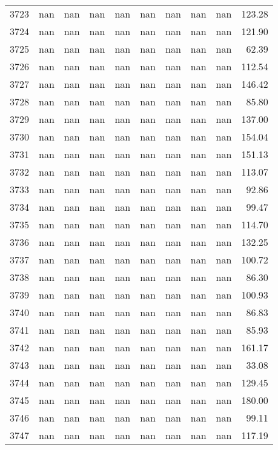 \begin{tabular}{lrrrrrrrrr}
3723 & nan & nan & nan & nan & nan & nan & nan & nan & 123.28 \\
3724 & nan & nan & nan & nan & nan & nan & nan & nan & 121.90 \\
3725 & nan & nan & nan & nan & nan & nan & nan & nan & 62.39 \\
3726 & nan & nan & nan & nan & nan & nan & nan & nan & 112.54 \\
3727 & nan & nan & nan & nan & nan & nan & nan & nan & 146.42 \\
3728 & nan & nan & nan & nan & nan & nan & nan & nan & 85.80 \\
3729 & nan & nan & nan & nan & nan & nan & nan & nan & 137.00 \\
3730 & nan & nan & nan & nan & nan & nan & nan & nan & 154.04 \\
3731 & nan & nan & nan & nan & nan & nan & nan & nan & 151.13 \\
3732 & nan & nan & nan & nan & nan & nan & nan & nan & 113.07 \\
3733 & nan & nan & nan & nan & nan & nan & nan & nan & 92.86 \\
3734 & nan & nan & nan & nan & nan & nan & nan & nan & 99.47 \\
3735 & nan & nan & nan & nan & nan & nan & nan & nan & 114.70 \\
3736 & nan & nan & nan & nan & nan & nan & nan & nan & 132.25 \\
3737 & nan & nan & nan & nan & nan & nan & nan & nan & 100.72 \\
3738 & nan & nan & nan & nan & nan & nan & nan & nan & 86.30 \\
3739 & nan & nan & nan & nan & nan & nan & nan & nan & 100.93 \\
3740 & nan & nan & nan & nan & nan & nan & nan & nan & 86.83 \\
3741 & nan & nan & nan & nan & nan & nan & nan & nan & 85.93 \\
3742 & nan & nan & nan & nan & nan & nan & nan & nan & 161.17 \\
3743 & nan & nan & nan & nan & nan & nan & nan & nan & 33.08 \\
3744 & nan & nan & nan & nan & nan & nan & nan & nan & 129.45 \\
3745 & nan & nan & nan & nan & nan & nan & nan & nan & 180.00 \\
3746 & nan & nan & nan & nan & nan & nan & nan & nan & 99.11 \\
3747 & nan & nan & nan & nan & nan & nan & nan & nan & 117.19 \\

\end{tabular}
